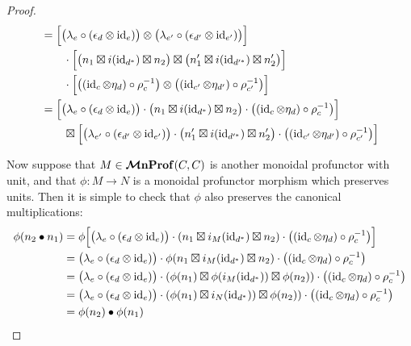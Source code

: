\documentclass[12pt,oneside,article,draft]{memoir}
\begin{document}
\begin{proof}
\begin{align*}
      &= \Bigl[\bigl(\lambda_e\circ(\epsilon_d\otimes\operatorname{id}_e)\bigr)\otimes\bigl(\lambda_{e'}\circ(\epsilon_{d'}\otimes\operatorname{id}_{e'})\bigr)\Bigr] \\
      &\qquad \cdot\Bigl[\bigl(n_1\boxtimes i(\operatorname{id}_{d^*})\boxtimes n_2\bigr)\boxtimes\bigl(n'_1\boxtimes i(\operatorname{id}_{d'^*})\boxtimes n'_2\bigr)\Bigr] \\
      &\qquad \cdot\Bigl[\bigl((\operatorname{id}_c\otimes\eta_d)\circ\rho_c^{-1}\bigr)\otimes\bigl((\operatorname{id}_{c'}\otimes\eta_{d'})\circ\rho_{c'}^{-1}\bigr)\Bigr] \\
      &= \Bigl[\bigl(\lambda_e\circ(\epsilon_d\otimes\operatorname{id}_e)\bigr)\cdot\bigl(n_1\boxtimes i(\operatorname{id}_{d^*})\boxtimes n_2\bigr)\cdot\bigl((\operatorname{id}_c\otimes\eta_d)\circ\rho_c^{-1}\bigr)\Bigr] \\
      &\qquad \boxtimes\Bigl[\bigl(\lambda_{e'}\circ(\epsilon_{d'}\otimes\operatorname{id}_{e'})\bigr)\cdot\bigl(n'_1\boxtimes i(\operatorname{id}_{d'^*})\boxtimes n'_2\bigr)\cdot\bigl((\operatorname{id}_{c'}\otimes\eta_{d'})\circ\rho_{c'}^{-1}\bigr)\Bigr]
   \end{align*}

   Now suppose that $M\in\bm{\mathcal{M}}\mathbf{nProf}(C, C)$ is another monoidal profunctor with unit, and that $\phi\colon M\to N$ is a monoidal profunctor morphism which preserves units.
   Then it is simple to check that $\phi$ also preserves the canonical multiplications:
   \begin{align*}
      \phi(n_2\bullet n_1) &= \phi\Bigl[\bigl(\lambda_e\circ(\epsilon_d\otimes\operatorname{id}_e)\bigr)\cdot(n_1\boxtimes i_M(\operatorname{id}_{d^*})\boxtimes n_2)\cdot\bigl((\operatorname{id}_c\otimes \eta_d)\circ\rho_c^{-1}\bigr)\Bigr] \\
      &= \bigl(\lambda_e\circ(\epsilon_d\otimes\operatorname{id}_e)\bigr)\cdot\phi(n_1\boxtimes i_M(\operatorname{id}_{d^*})\boxtimes n_2)\cdot\bigl((\operatorname{id}_c\otimes \eta_d)\circ\rho_c^{-1}\bigr) \\
      &= \bigl(\lambda_e\circ(\epsilon_d\otimes\operatorname{id}_e)\bigr)\cdot(\phi(n_1)\boxtimes \phi(i_M(\operatorname{id}_{d^*}))\boxtimes \phi(n_2))\cdot\bigl((\operatorname{id}_c\otimes \eta_d)\circ\rho_c^{-1}\bigr) \\
      &= \bigl(\lambda_e\circ(\epsilon_d\otimes\operatorname{id}_e)\bigr)\cdot(\phi(n_1)\boxtimes i_N(\operatorname{id}_{d^*}))\boxtimes \phi(n_2))\cdot\bigl((\operatorname{id}_c\otimes \eta_d)\circ\rho_c^{-1}\bigr) \\
      &= \phi(n_2)\bullet\phi(n_1)
   \end{align*}
\end{proof}
\end{document}
